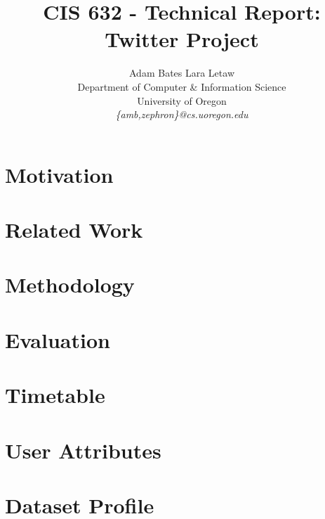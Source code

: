 \documentclass[10pt,twocolumn]{IEEEtran11}
\begin{document}


\title{\Large \bf CIS 632 - Technical Report: Twitter Project
}

\author{Adam Bates \hspace{0.25cm} Lara Letaw\\
Department of Computer \& Information Science\\
University of Oregon\\
\textit{\{amb,zephron\}@cs.uoregon.edu}}

\maketitle


%

\section{Motivation}  


\section{Related Work}  


\section{Methodology}


\section{Evaluation}


\section{Timetable}


\onecolumn
\section{User Attributes}


\twocolumn
\section{Dataset Profile}



\end{document}

